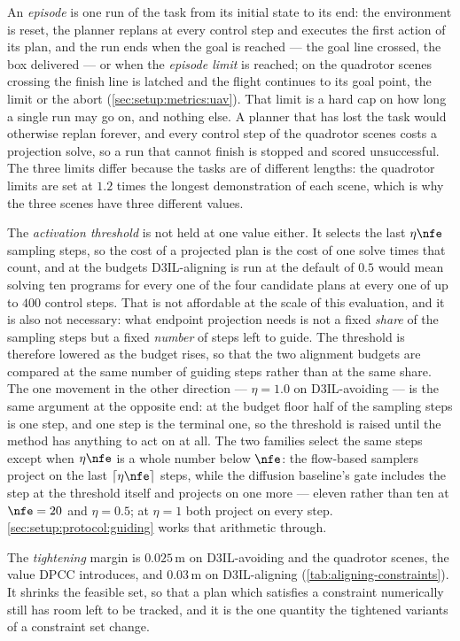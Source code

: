 An \emph{episode} is one run of the task from its initial state to its end: the environment is reset, the
planner replans at every control step and executes the first action of its plan, and the run ends when the
goal is reached --- the goal line crossed, the box delivered --- or when the \emph{episode limit} is reached; on the
quadrotor scenes crossing the finish line is latched and the flight continues to its goal point, the limit or the
abort (\autoref{sec:setup:metrics:uav}). That limit is a hard cap on how long a single run may
go on, and nothing else. A planner that has lost the task would otherwise replan forever, and every control step of the
quadrotor scenes costs a projection solve, so a run that cannot finish is stopped and scored unsuccessful.
The three limits differ because the tasks are of different lengths: the quadrotor limits are set at $1.2$
times the longest demonstration of each scene, which is why the three scenes have three different values.

The \emph{activation threshold} is not held at one value either. It selects the last $\eta\nfe$ sampling
steps, so the cost of a projected plan is the cost of one solve times that count, and at the budgets
D3IL-aligning is run at the default of $0.5$ would mean solving ten programs for every one of the four
candidate plans at every one of up to $400$ control steps. That is not affordable at the scale of this
evaluation, and it is also not necessary: what endpoint projection needs is not a fixed \emph{share} of
the sampling steps but a fixed \emph{number} of steps left to guide. The threshold is therefore lowered as
the budget rises, so that the two alignment budgets are compared at the same number of guiding steps
rather than at the same share. The one movement in the other direction --- $\eta=1.0$ on D3IL-avoiding ---
is the same argument at the opposite end: at the budget floor half of the sampling steps is one step, and
one step is the terminal one, so the threshold is raised until the method has anything to act on at all.
The two families select the same steps except when $\eta\nfe$ is a whole number below $\nfe$: the
flow-based samplers project on the last $\lceil\eta\nfe\rceil$ steps, while the diffusion baseline's gate
includes the step at the threshold itself and projects on one more --- eleven rather than ten at $\nfe=20$
and $\eta=0.5$; at $\eta=1$ both project on every step.
\autoref{sec:setup:protocol:guiding} works that arithmetic through.

The \emph{tightening} margin is $0.025$\,m on D3IL-avoiding and the quadrotor scenes, the value \ac{DPCC}
introduces, and $0.03$\,m on D3IL-aligning (\autoref{tab:aligning-constraints}). It
shrinks the feasible set, so that a plan which satisfies a constraint numerically still has room left to be
tracked, and it is the one quantity the tightened variants of a constraint set change.

